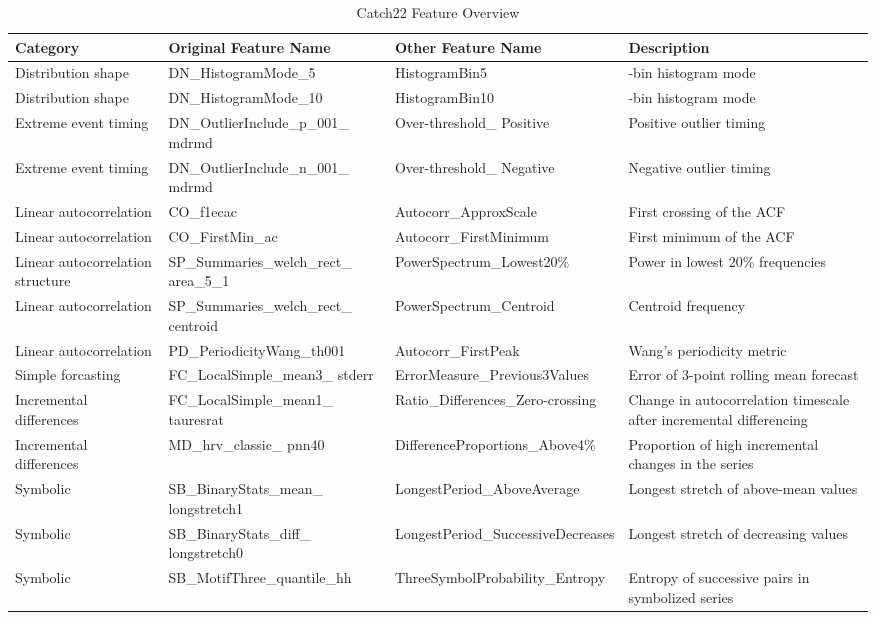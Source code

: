 \documentclass{article}
\begin{document}
\renewcommand{\arraystretch}{1.5}

\begin{table}[H]

\caption{\label{tab:unnamed-chunk-22}Catch22 Feature Overview}
\centering
\begin{tabular}[t]{>{\raggedright\arraybackslash}p{0.7in}|>{\raggedright\arraybackslash}p{2.1in}|>{\raggedright\arraybackslash}p{2.1in}|>{\raggedright\arraybackslash}p{1in}}
\hline
Category & Original Feature Name & Other Feature Name & Description\\
\hline
Distribution shape & DN\_HistogramMode\_5 & HistogramBin5 & 5-bin histogram mode\\
\hline
Distribution shape & DN\_HistogramMode\_10 & HistogramBin10 & 10-bin histogram mode\\
\hline
Extreme event timing & DN\_OutlierInclude\_p\_001\_ mdrmd & Over-threshold\_ Positive & Positive outlier timing\\
\hline
Extreme event timing & DN\_OutlierInclude\_n\_001\_ mdrmd & Over-threshold\_ Negative & Negative outlier timing\\
\hline
Linear autocorrelation & CO\_f1ecac & Autocorr\_ApproxScale & First  crossing of the ACF\\
\hline
Linear autocorrelation & CO\_FirstMin\_ac & Autocorr\_FirstMinimum & First minimum of the ACF\\
\hline
Linear autocorrelation structure & SP\_Summaries\_welch\_rect\_ area\_5\_1 & PowerSpectrum\_Lowest20\% & Power in lowest 20\% frequencies\\
\hline
Linear autocorrelation & SP\_Summaries\_welch\_rect\_ centroid & PowerSpectrum\_Centroid & Centroid frequency\\
\hline
Linear autocorrelation & PD\_PeriodicityWang\_th001 & Autocorr\_FirstPeak & Wang's periodicity metric\\
\hline
Simple forcasting & FC\_LocalSimple\_mean3\_ stderr & ErrorMeasure\_Previous3Values & Error of 3-point rolling mean forecast\\
\hline
Incremental differences & FC\_LocalSimple\_mean1\_ tauresrat & Ratio\_Differences\_Zero-crossing & Change in autocorrelation timescale after incremental differencing\\
\hline
Incremental differences & MD\_hrv\_classic\_ pnn40 & DifferenceProportions\_Above4\% & Proportion of high incremental changes in the series\\
\hline
Symbolic & SB\_BinaryStats\_mean\_ longstretch1 & LongestPeriod\_AboveAverage & Longest stretch of above-mean values\\
\hline
Symbolic & SB\_BinaryStats\_diff\_ longstretch0 & LongestPeriod\_SuccessiveDecreases & Longest stretch of decreasing values\\
\hline
Symbolic & SB\_MotifThree\_quantile\_hh & ThreeSymbolProbability\_Entropy & Entropy of successive pairs in symbolized series\\
\hline
\end{tabular}
\end{table}
\end{document}
